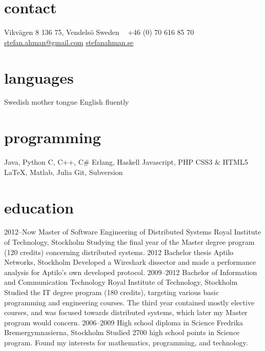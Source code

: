 \documentclass['print']{friggeri-cv} %
\begin{document}


\begin{aside} %
\section{contact}
Vikvägen 8
136 75, Vendelsö
Sweden
~
+46 (0) 70 616 85 70
~
\href{mailto:stefan.ahman@gmail.com}{stefan.ahman@gmail.com}
\href{http://www.stefanahman.se}{stefanahman.se}
\section{languages}
Swedish mother tongue
English fluently
\section{programming}
Java, Python
C, C++, C\#
Erlang, Haskell
Javascript, PHP
CSS3 \& HTML5
LaTeX, Matlab, Julia
Git, Subversion
\end{aside}


\section{education}

\begin{entrylist}
\entry
{2012--Now}
{Master {\normalfont of Software Engineering of Distributed Systems}}
{Royal Institute of Technology, Stockholm}
{Studying the final year of the Master degree program (120 credits) concerning distributed systems.}
\entry
{2012}
{Bachelor {\normalfont thesis}}
{Aptilo Networks, Stockholm}
{Developed a Wireshark dissector and made a performance analysis for Aptilo's own developed protocol.}
\entry
{2009--2012}
{Bachelor {\normalfont of Information and Communication Technology}}
{Royal Institute of Technology, Stockholm}
{Studied the IT degree program (180 credits), targeting various basic programming and engineering courses. The third year contained mostly elective courses, and was focused towards distributed systems, which later my Master program would concern.}
\entry
{2006--2009}
{High school diploma {\normalfont in Science}}
{Fredrika Bremergymnasierna, Stockholm}
{Studied 2700 high school points in Science program. Found my interests for mathematics, programming, and technology.}
\end{entrylist}
\end{document}
